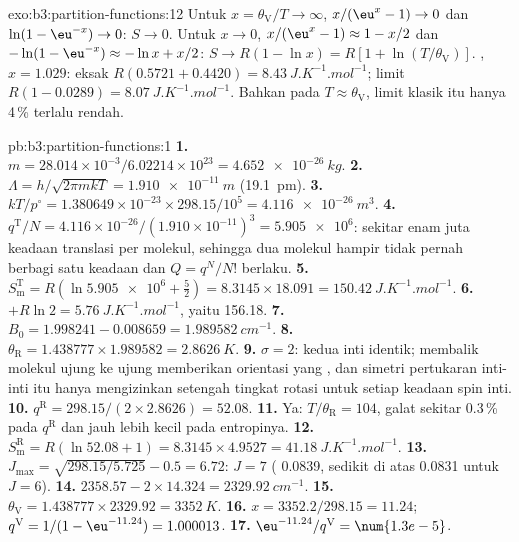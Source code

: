 \begin{solution}{exo:b3:partition-functions:12}
Untuk $x = \theta_{\mathrm V}/T \to \infty$, $x/(\eu^x - 1) \to 0$ dan $\ln(1 - \eu^{-x}) \to 0$: $S \to 0$.
Untuk $x \to 0$,
$x/(\eu^x - 1) \approx 1 - x/2$ dan $-\ln(1 - \eu^{-x}) \approx -\ln x + x/2$: $S \to R(1 - \ln x) = R[1 + \ln(T/\theta_{\mathrm V})]$.
, $x = 1.029$: eksak $R(0.5721 + 0.4420) = \qty{8.43}{J.K^{-1}.mol^{-1}}$;
limit $R(1 - 0.0289) =
\qty{8.07}{J.K^{-1}.mol^{-1}}$. Bahkan pada $T \approx \theta_{\mathrm V}$, limit
klasik itu hanya 4\,\% terlalu rendah.
\end{solution}

\begin{solution}{pb:b3:partition-functions:1}
\textbf{1.} $m = 28.014\times10^{-3}/6.02214\times10^{23} = \qty{4.652e-26}{kg}$.
\textbf{2.} $\Lambda = h/\sqrt{2\pi mkT} = \qty{1.910e-11}{m}$ (\qty{19.1}{pm}).
\textbf{3.} $kT/p^\circ = 1.380649\times10^{-23} \times 298.15/10^5 = \qty{4.116e-26}{m^3}$.
\textbf{4.} $q^{\mathrm T}/N = 4.116\times10^{-26}/(1.910\times10^{-11})^3 = \num{5.905e6}$:
sekitar enam juta keadaan translasi per molekul, sehingga dua molekul hampir
tidak pernah berbagi satu keadaan dan $Q = q^N/N!$ berlaku.
\textbf{5.} $S^{\mathrm T}_{\mathrm m} = R(\ln\num{5.905e6} + \frac52) = 8.3145 \times 18.091 = \qty{150.42}{J.K^{-1}.mol^{-1}}$.
\textbf{6.} $+R\ln2 = \qty{5.76}{J.K^{-1}.mol^{-1}}$, yaitu \num{156.18}.
\textbf{7.} $B_0 = 1.998241 - 0.008659 = \qty{1.989582}{cm^{-1}}$.
\textbf{8.} $\theta_{\mathrm R} = 1.438777 \times 1.989582 = \qty{2.8626}{K}$.
\textbf{9.} $\sigma = 2$: kedua inti identik; membalik molekul ujung ke ujung
memberikan orientasi yang , dan simetri pertukaran inti-inti itu
hanya mengizinkan setengah tingkat rotasi untuk setiap keadaan spin inti.
\textbf{10.} $q^{\mathrm R} = 298.15/(2 \times 2.8626) = 52.08$.
\textbf{11.} Ya: $T/\theta_{\mathrm R} = 104$, galat sekitar 0.3\,\% pada $q^{\mathrm R}$ dan
jauh lebih kecil pada entropinya.
\textbf{12.} $S^{\mathrm R}_{\mathrm m} = R(\ln52.08 + 1) = 8.3145 \times 4.9527 = \qty{41.18}{J.K^{-1}.mol^{-1}}$.
\textbf{13.} $J_{\max} = \sqrt{298.15/5.725} - 0.5 = 6.72$: $J = 7$ ( 0.0839,
sedikit di atas 0.0831 untuk $J = 6$).
\textbf{14.} $2358.57 - 2 \times 14.324 = \qty{2329.92}{cm^{-1}}$.
\textbf{15.} $\theta_{\mathrm V} = 1.438777 \times 2329.92 = \qty{3352}{K}$.
\textbf{16.} $x = 3352.2/298.15 = 11.24$; $q^{\mathrm V} = 1/(1 - \eu^{-11.24}) = 1.000013$.
\textbf{17.} $\eu^{-11.24}/q^{\mathrm V} = \num{1.3e-5}$.

\end{solution}
